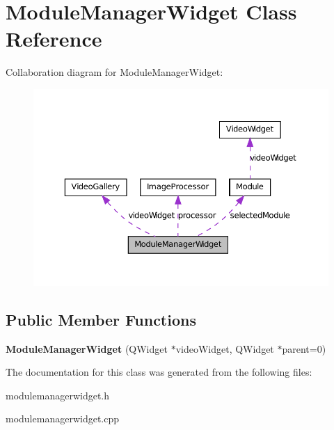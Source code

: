 \hypertarget{class_module_manager_widget}{
\section{ModuleManagerWidget Class Reference}
\label{dd/da9/class_module_manager_widget}
}


Collaboration diagram for ModuleManagerWidget:
\nopagebreak
\begin{figure}[H]
\begin{center}
\leavevmode
\includegraphics[width=369pt]{d4/d04/class_module_manager_widget__coll__graph}
\end{center}
\end{figure}
\subsection*{Public Member Functions}
\begin{DoxyCompactItemize}
\item 
\hypertarget{class_module_manager_widget_a37d02cb7f61ed428c3a50ba560caadbb}{
{\bfseries ModuleManagerWidget} (QWidget $\ast$videoWidget, QWidget $\ast$parent=0)}
\label{dd/da9/class_module_manager_widget_a37d02cb7f61ed428c3a50ba560caadbb}

\end{DoxyCompactItemize}


The documentation for this class was generated from the following files:\begin{DoxyCompactItemize}
\item 
modulemanagerwidget.h\item 
modulemanagerwidget.cpp\end{DoxyCompactItemize}
